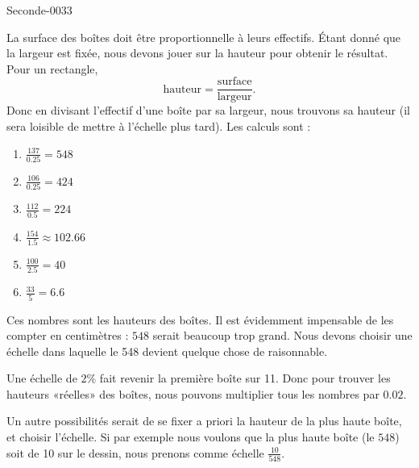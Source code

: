 
\begin{corrige}{Seconde-0033}

    La surface des boîtes doit être proportionnelle à leurs effectifs. Étant donné que la largeur est fixée, nous devons jouer sur la hauteur pour obtenir le résultat. Pour un rectangle,
    \begin{equation}
        \text{hauteur}=\frac{ \text{surface} }{ \text{largeur} }.
    \end{equation}
    Donc en divisant l'effectif d'une boîte par sa largeur, nous trouvons sa hauteur (il sera loisible de mettre à l'échelle plus tard). Les calculs sont :
    \begin{enumerate}
        \item
            \( \frac{ 137 }{ 0.25 }=548\)
        \item
            \( \frac{ 106 }{ 0.25 }=424\)
        \item
            \( \frac{ 112 }{ 0.5 }=224\)
        \item
            \( \frac{ 154 }{ 1.5 }\approx 102.66\)
        \item
            \( \frac{ 100 }{ 2.5 }=40\)
        \item
            \( \frac{ 33 }{ 5 }=6.6\)
    \end{enumerate}
    Ces nombres sont les hauteurs des boîtes. Il est évidemment impensable de les compter en centimètres : \( 548\) serait beaucoup trop grand. Nous devons choisir une échelle dans laquelle le 548 devient quelque chose de raisonnable.

    Une échelle de \( 2\%\) fait revenir la première boîte sur \unit{11}{\centi\meter}. Donc pour trouver les hauteurs «réelles» des boîtes, nous pouvons multiplier tous les nombres par \( 0.02\).

    Un autre possibilités serait de se fixer a priori la hauteur de la plus haute boîte, et choisir l'échelle. Si par exemple nous voulons que la plus haute boîte (le \( 548\)) soit de \unit{10}{\centi\meter} sur le dessin, nous prenons comme échelle \( \frac{ 10 }{ 548 }\).


\end{corrige}
